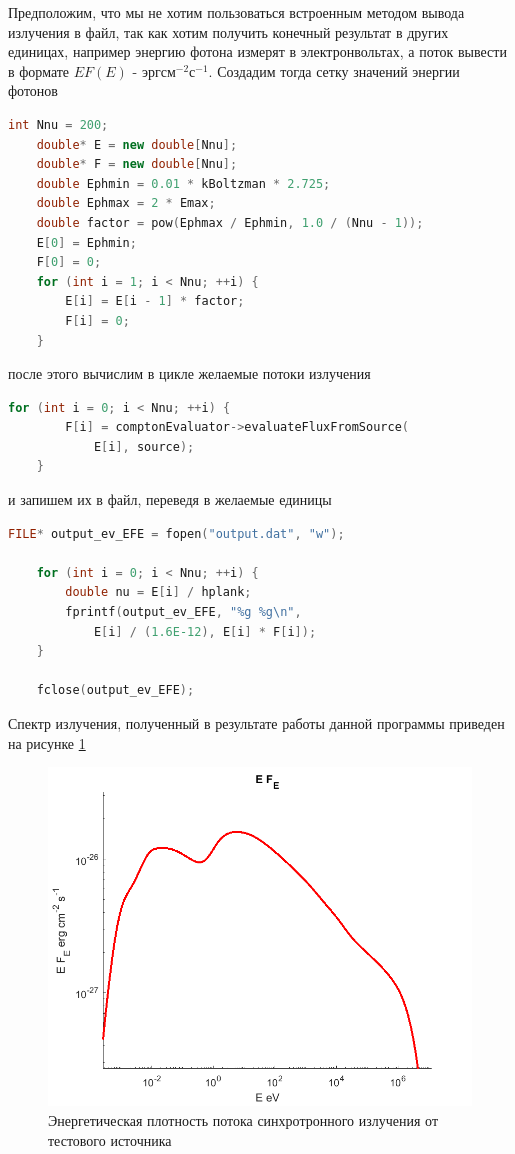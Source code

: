 Предположим, что мы не хотим пользоваться встроенным методом вывода излучения в файл, так как хотим получить конечный результат в других единицах, например энергию фотона измерят в электронвольтах, а поток вывести в формате $E F(E)$ - $\text{эрг}\text{см}^{-2}\text{с}^{-1}$. Создадим тогда сетку значений энергии фотонов
\begin{lstlisting}[language=c++]
	int Nnu = 200;
	double* E = new double[Nnu];
	double* F = new double[Nnu];
	double Ephmin = 0.01 * kBoltzman * 2.725;
	double Ephmax = 2 * Emax;
	double factor = pow(Ephmax / Ephmin, 1.0 / (Nnu - 1));
	E[0] = Ephmin;
	F[0] = 0;
	for (int i = 1; i < Nnu; ++i) {
		E[i] = E[i - 1] * factor;
		F[i] = 0;
	}
\end{lstlisting}
после этого вычислим в цикле желаемые потоки излучения
\begin{lstlisting}[language=c++]
	for (int i = 0; i < Nnu; ++i) {
		F[i] = comptonEvaluator->evaluateFluxFromSource(
		    E[i], source);
	}
\end{lstlisting}
и запишем их в файл, переведя в желаемые единицы
\begin{lstlisting}[language=c++]
	FILE* output_ev_EFE = fopen("output.dat", "w");
	
	for (int i = 0; i < Nnu; ++i) {
		double nu = E[i] / hplank;
		fprintf(output_ev_EFE, "%g %g\n",
		    E[i] / (1.6E-12), E[i] * F[i]);
	}

	fclose(output_ev_EFE);
\end{lstlisting}
Спектр излучения, полученный в результате работы данной программы приведен на рисунке \ref{compton}
\begin{figure}
	\centering
	\includegraphics[width=12.5 cm]{./fig/compton.png} 
	\caption{Энергетическая плотность потока синхротронного излучения от тестового источника}
	\label{compton}
\end{figure}

